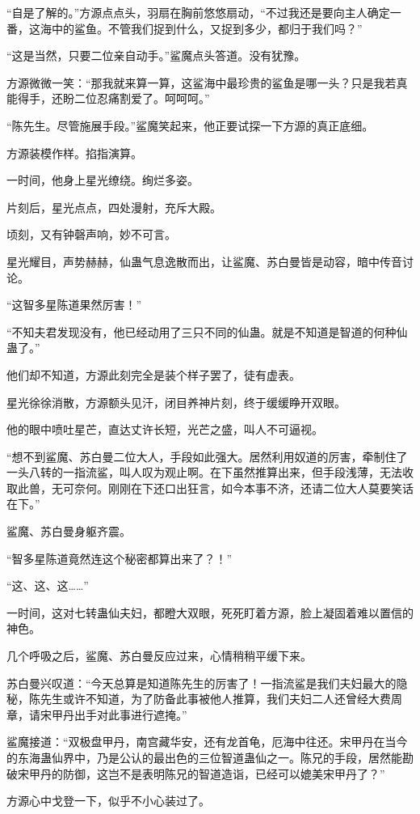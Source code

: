 \begin{this_body}
“自是了解的。”方源点点头，羽扇在胸前悠悠扇动，“不过我还是要向主人确定一番，这海中的鲨鱼。不管我们捉到什么，又捉到多少，都归于我们吗？”

“这是当然，只要二位亲自动手。”鲨魔点头答道。没有犹豫。

方源微微一笑：“那我就来算一算，这鲨海中最珍贵的鲨鱼是哪一头？只是我若真能得手，还盼二位忍痛割爱了。呵呵呵。”

“陈先生。尽管施展手段。”鲨魔笑起来，他正要试探一下方源的真正底细。

方源装模作样。掐指演算。

一时间，他身上星光缭绕。绚烂多姿。

片刻后，星光点点，四处漫射，充斥大殿。

顷刻，又有钟磬声响，妙不可言。

星光耀目，声势赫赫，仙蛊气息逸散而出，让鲨魔、苏白曼皆是动容，暗中传音讨论。

“这智多星陈道果然厉害！”

“不知夫君发现没有，他已经动用了三只不同的仙蛊。就是不知道是智道的何种仙蛊了。”

他们却不知道，方源此刻完全是装个样子罢了，徒有虚表。

星光徐徐消散，方源额头见汗，闭目养神片刻，终于缓缓睁开双眼。

他的眼中喷吐星芒，直达丈许长短，光芒之盛，叫人不可逼视。

“想不到鲨魔、苏白曼二位大人，手段如此强大。居然利用奴道的厉害，牵制住了一头八转的一指流鲨，叫人叹为观止啊。在下虽然推算出来，但手段浅薄，无法收取此兽，无可奈何。刚刚在下还口出狂言，如今本事不济，还请二位大人莫要笑话在下。”

鲨魔、苏白曼身躯齐震。

“智多星陈道竟然连这个秘密都算出来了？！”

“这、这、这……”

一时间，这对七转蛊仙夫妇，都瞪大双眼，死死盯着方源，脸上凝固着难以置信的神色。

几个呼吸之后，鲨魔、苏白曼反应过来，心情稍稍平缓下来。

苏白曼兴叹道：“今天总算是知道陈先生的厉害了！一指流鲨是我们夫妇最大的隐秘，陈先生或许不知道，为了防备此事被他人推算，我们夫妇二人还曾经大费周章，请宋甲丹出手对此事进行遮掩。”

鲨魔接道：“双极盘甲丹，南宫藏华安，还有龙首龟，厄海中往还。宋甲丹在当今的东海蛊仙界中，乃是公认的最出色的三位智道蛊仙之一。陈兄的手段，居然能勘破宋甲丹的防御，这岂不是表明陈兄的智道造诣，已经可以媲美宋甲丹了？”

方源心中戈登一下，似乎不小心装过了。


\end{this_body}
